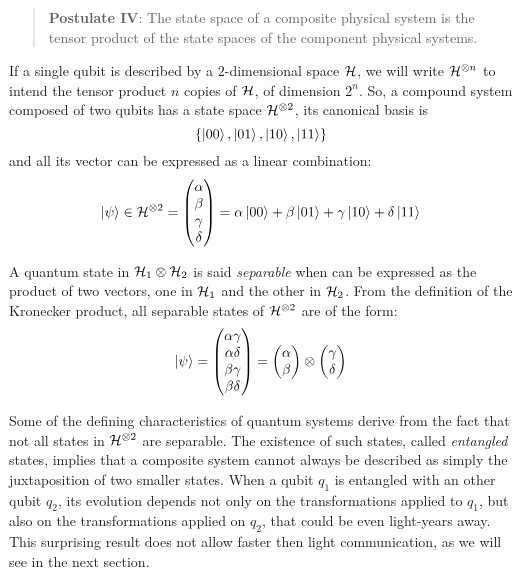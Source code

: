 \begin{quote}
\textbf{Postulate IV}: The state space of a composite physical system is the tensor product of the state spaces of the component physical systems. 
\end{quote}

If a single qubit is described by a $2$-dimensional space $\mathcal{H}$, we will write $\mathcal{H}^{\otimes n}$ to intend the tensor product $n$ copies of $\mathcal{H}$, of dimension $2^n$. So, a compound system composed of two qubits has a state space $\mathcal{H}^{\otimes 2}$, its canonical basis is 
\[\{\ket{00}, \ket{01}, \ket{10}, \ket{11}\}\]
and all its vector can be expressed as a linear combination:
\[\ket{\psi} \in \mathcal{H}^{\otimes 2} = \begin{pmatrix}
\alpha \\ \beta \\ \gamma \\ \delta
\end{pmatrix} = \alpha\ket{00} + \beta\ket{01} + \gamma\ket{10} + \delta\ket{11}\]

A quantum state in $\mathcal{H}_1 \otimes \mathcal{H}_2$ is said \textit{separable} when can be expressed as the product of two vectors, one in $\mathcal{H}_1$ and the other in $\mathcal{H}_2$. From the definition of the Kronecker product, all separable states of $\mathcal{H}^{\otimes 2}$ are of the form:
\[
 \ket{\psi} = \begin{pmatrix}
 \alpha\gamma \\ \alpha\delta \\ \beta\gamma \\ \beta\delta
 \end{pmatrix} = 
 \begin{pmatrix}
 \alpha \\ \beta
 \end{pmatrix} \otimes 
 \begin{pmatrix}
 \gamma \\ \delta
 \end{pmatrix}
\]

Some of the defining characteristics of quantum systems derive from the fact that not all states in $\mathcal{H}^{\otimes 2}$ are separable. The existence of such states, called \textit{entangled} states, implies that a composite system cannot always be described as simply the juxtaposition of two smaller states. When a qubit $q_1$ is entangled with an other qubit $q_2$, its evolution depends not only on the transformations applied to $q_1$, but also on the transformations applied on $q_2$, that could be even light-years away. This surprising result does not allow faster then light communication, as we will see in the next section.

